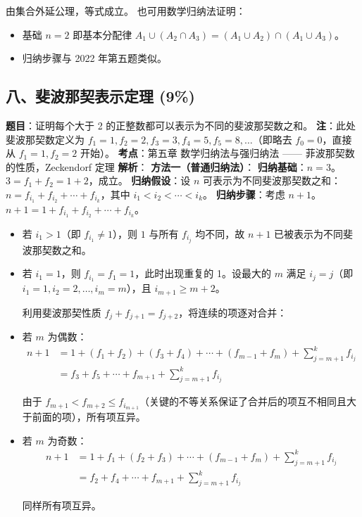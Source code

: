 \documentclass[10pt,a4paper,openany]{ctexbook}
\theoremstyle{definition}
\theoremstyle{remark}
\begin{document}
由集合外延公理，等式成立。
也可用数学归纳法证明：
\begin{itemize}
\item 基础 $n = 2$ 即基本分配律 $A_1 \cup (A_2 \cap A_3) = (A_1 \cup A_2) \cap (A_1 \cup A_3)$。
\item 归纳步骤与 2022 年第五题类似。

\end{itemize}

\vspace{-2pt}

\subsection{八、斐波那契表示定理 (9\%)}

\textbf{题目}：证明每个大于 2 的正整数都可以表示为不同的斐波那契数之和。
\textbf{注}：此处斐波那契数定义为 $f_1 = 1, f_2 = 2, f_3 = 3, f_4 = 5, f_5 = 8, \ldots$（即略去 $f_0 = 0$，直接从 $f_1 = 1, f_2 = 2$ 开始）。
\textbf{考点}：第五章 数学归纳法与强归纳法 —— 菲波那契数的性质，Zeckendorf 定理
\textbf{解析}：
\textbf{方法一（普通归纳法）}：
\textbf{归纳基础}：$n = 3$。$3 = f_1 + f_2 = 1 + 2$，成立。
\textbf{归纳假设}：设 $n$ 可表示为不同斐波那契数之和：$n = f_{i_1} + f_{i_2} + \cdots + f_{i_k}$，其中 $i_1 < i_2 < \cdots < i_k$。
\textbf{归纳步骤}：考虑 $n + 1$。$n + 1 = 1 + f_{i_1} + f_{i_2} + \cdots + f_{i_k}$。
\begin{itemize}
\item 若 $i_1 > 1$（即 $f_{i_1} \neq 1$），则 $1$ 与所有 $f_{i_j}$ 均不同，故 $n+1$ 已被表示为不同斐波那契数之和。

\item 若 $i_1 = 1$，则 $f_{i_1} = f_1 = 1$，此时出现重复的 1。设最大的 $m$ 满足 $i_j = j$（即 $i_1 = 1, i_2 = 2, \ldots, i_m = m$），且 $i_{m+1} \ge m + 2$。

利用斐波那契性质 $f_j + f_{j+1} = f_{j+2}$，将连续的项逐对合并：


\item 若 $m$ 为偶数：
\[
    \begin{aligned}
    n + 1 &= 1 + (f_1 + f_2) + (f_3 + f_4) + \cdots + (f_{m-1} + f_m) + \sum_{j=m+1}^k f_{i_j} \\
    &= f_3 + f_5 + \cdots + f_{m+1} + \sum_{j=m+1}^k f_{i_j}
    \end{aligned}
\]

由于 $f_{m+1} < f_{m+2} \le f_{i_{m+1}}$（关键的不等关系保证了合并后的项互不相同且大于前面的项），所有项互异。


\item 若 $m$ 为奇数：
\[
    \begin{aligned}
    n + 1 &= 1 + f_1 + (f_2 + f_3) + \cdots + (f_{m-1} + f_m) + \sum_{j=m+1}^k f_{i_j} \\
    &= f_2 + f_4 + \cdots + f_{m+1} + \sum_{j=m+1}^k f_{i_j}
    \end{aligned}
\]

同样所有项互异。


\end{itemize}
\end{document}
